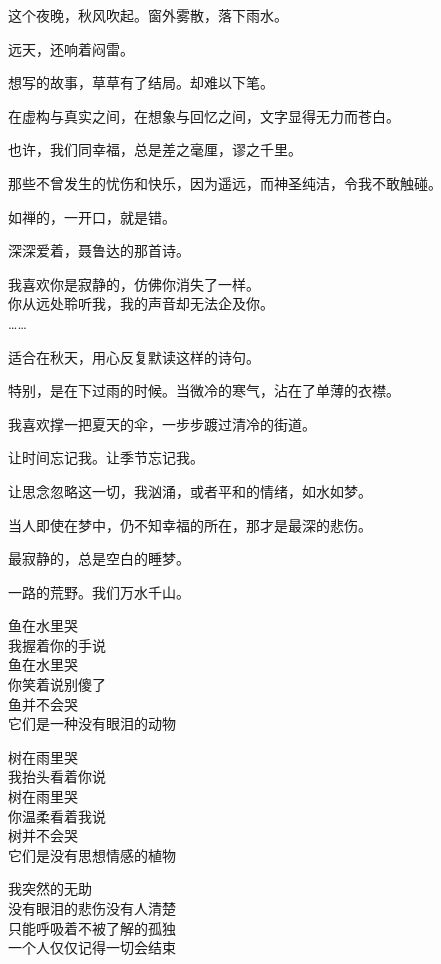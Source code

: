 		这个夜晚，秋风吹起。窗外雾散，落下雨水。\par
		远天，还响着闷雷。

		想写的故事，草草有了结局。却难以下笔。\par
		在虚构与真实之间，在想象与回忆之间，文字显得无力而苍白。\par
		也许，我们同幸福，总是差之毫厘，谬之千里。\par
		那些不曾发生的忧伤和快乐，因为遥远，而神圣纯洁，令我不敢触碰。\par
		如禅的，一开口，就是错。

		深深爱着，聂鲁达的那首诗。

		\longpoem{}{}{}
			我喜欢你是寂静的，仿佛你消失了一样。\\
			你从远处聆听我，我的声音却无法企及你。\\
			……
		\endlongpoem


		适合在秋天，用心反复默读这样的诗句。\par
		特别，是在下过雨的时候。当微冷的寒气，沾在了单薄的衣襟。\par
		我喜欢撑一把夏天的伞，一步步踱过清冷的街道。\par
		让时间忘记我。让季节忘记我。\par
		让思念忽略这一切，我汹涌，或者平和的情绪，如水如梦。\par
		当人即使在梦中，仍不知幸福的所在，那才是最深的悲伤。\par
		最寂静的，总是空白的睡梦。

		一路的荒野。我们万水千山。

	\endwriting



		\longpoem{}{}{}
			鱼在水里哭 \\
			我握着你的手说 \\
			鱼在水里哭 \\
			你笑着说别傻了 \\
			鱼并不会哭 \\
			它们是一种没有眼泪的动物


			树在雨里哭 \\
			我抬头看着你说 \\
			树在雨里哭 \\
			你温柔看着我说 \\
			树并不会哭 \\
			它们是没有思想情感的植物


			我突然的无助 \\
			没有眼泪的悲伤没有人清楚 \\
			只能呼吸着不被了解的孤独 \\
			一个人仅仅记得一切会结束

